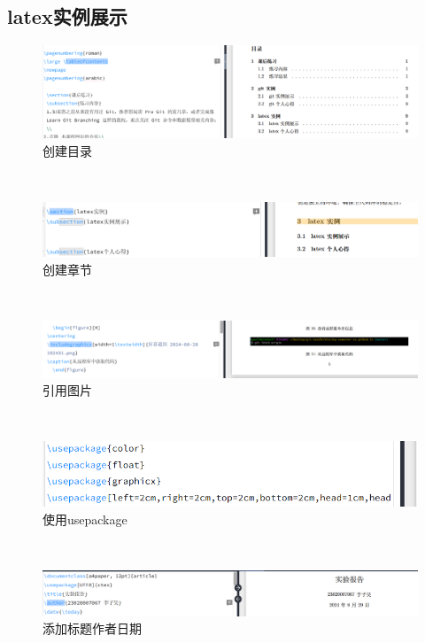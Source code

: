 \documentclass[a4paper, 12pt]{article}
\begin{document}
\subsection{latex实例展示}


\begin{figure}[H]
  \centering
  \includegraphics[width=1\textwidth]{屏幕截图 2024-08-29 193720.png}
  \caption{创建目录}
    \end{figure}
\\    
    \begin{figure}[H]
  \centering
  \includegraphics[width=1\textwidth]{屏幕截图 2024-08-29 193915.png}
  \caption{创建章节}
    \end{figure}
\\
\begin{figure}[H]
  \centering
  \includegraphics[width=1\textwidth]{屏幕截图 2024-08-29 193853.png}
  \caption{引用图片}
    \end{figure}
 \\   
    \begin{figure}[H]
  \centering
  \includegraphics[width=1\textwidth]{屏幕截图 2024-08-29 194021.png}
  \caption{使用usepackage}
    \end{figure}
\\
\begin{figure}[H]
  \centering
  \includegraphics[width=1\textwidth]{屏幕截图 2024-08-29 194006.png}
  \caption{添加标题作者日期}
    \end{figure}
\end{document}
